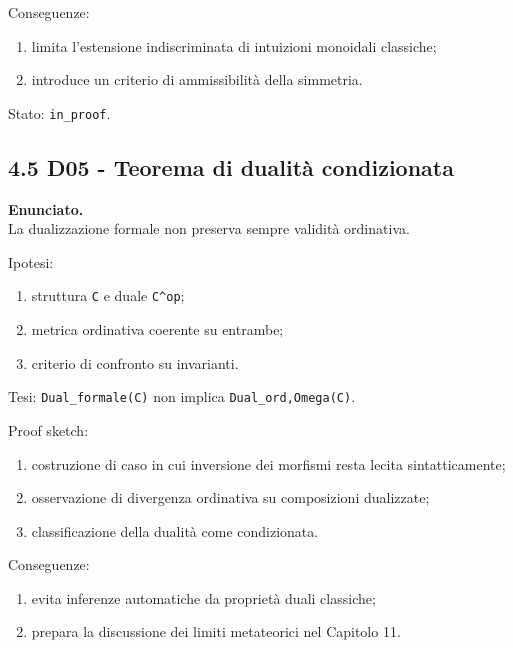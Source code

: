 Conseguenze:

\begin{enumerate}
\def\labelenumi{\arabic{enumi}.}
\tightlist
\item
  limita l'estensione indiscriminata di intuizioni monoidali classiche;
\item
  introduce un criterio di ammissibilità della simmetria.
\end{enumerate}

Stato: \texttt{in\_proof}.

\subsection{4.5 D05 - Teorema di dualità condizionata}

\textbf{Enunciato.}\\
La dualizzazione formale non preserva sempre validità ordinativa.

Ipotesi:

\begin{enumerate}
\def\labelenumi{\arabic{enumi}.}
\tightlist
\item
  struttura \texttt{C} e duale \texttt{C\^{}op};
\item
  metrica ordinativa coerente su entrambe;
\item
  criterio di confronto su invarianti.
\end{enumerate}

Tesi:
\texttt{Dual\_formale(C)} non implica \texttt{Dual\_ord,Omega(C)}.

Proof sketch:

\begin{enumerate}
\def\labelenumi{\arabic{enumi}.}
\tightlist
\item
  costruzione di caso in cui inversione dei morfismi resta lecita sintatticamente;
\item
  osservazione di divergenza ordinativa su composizioni dualizzate;
\item
  classificazione della dualità come condizionata.
\end{enumerate}

Conseguenze:

\begin{enumerate}
\def\labelenumi{\arabic{enumi}.}
\tightlist
\item
  evita inferenze automatiche da proprietà duali classiche;
\item
  prepara la discussione dei limiti metateorici nel Capitolo 11.
\end{enumerate}

